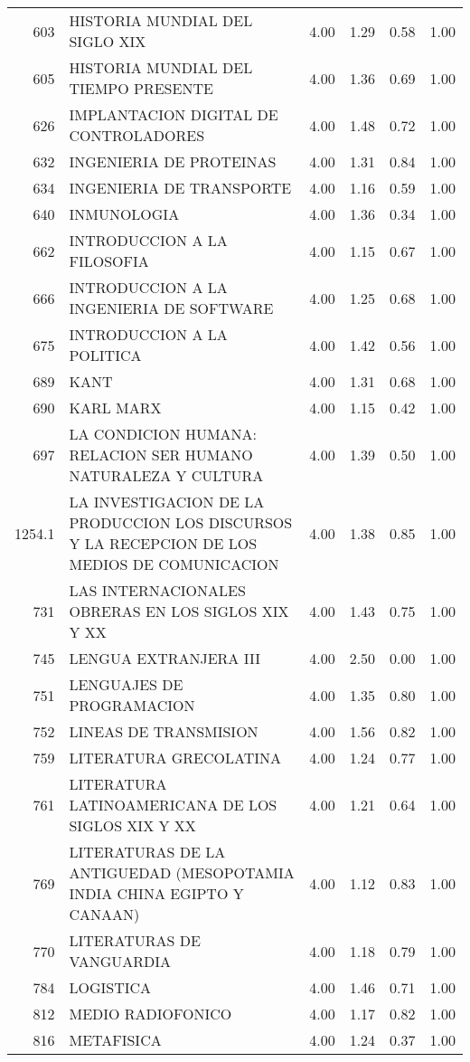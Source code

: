 \documentclass[12pt]{article}
\begin{document}
\begin{table}[ht]
\begin{tabular}{rlrrrr}
  603 & HISTORIA MUNDIAL DEL SIGLO XIX & 4.00 & 1.29 & 0.58 & 1.00 \\ 
  605 & HISTORIA MUNDIAL DEL TIEMPO PRESENTE & 4.00 & 1.36 & 0.69 & 1.00 \\ 
  626 & IMPLANTACION DIGITAL DE CONTROLADORES & 4.00 & 1.48 & 0.72 & 1.00 \\ 
  632 & INGENIERIA DE PROTEINAS & 4.00 & 1.31 & 0.84 & 1.00 \\ 
  634 & INGENIERIA DE TRANSPORTE & 4.00 & 1.16 & 0.59 & 1.00 \\ 
  640 & INMUNOLOGIA & 4.00 & 1.36 & 0.34 & 1.00 \\ 
  662 & INTRODUCCION A LA FILOSOFIA & 4.00 & 1.15 & 0.67 & 1.00 \\ 
  666 & INTRODUCCION A LA INGENIERIA DE SOFTWARE & 4.00 & 1.25 & 0.68 & 1.00 \\ 
  675 & INTRODUCCION A LA POLITICA & 4.00 & 1.42 & 0.56 & 1.00 \\ 
  689 & KANT & 4.00 & 1.31 & 0.68 & 1.00 \\ 
  690 & KARL MARX & 4.00 & 1.15 & 0.42 & 1.00 \\ 
  697 & LA CONDICION HUMANA: RELACION SER HUMANO NATURALEZA Y CULTURA & 4.00 & 1.39 & 0.50 & 1.00 \\ 
  1254.1 & LA INVESTIGACION DE LA PRODUCCION LOS DISCURSOS Y LA RECEPCION DE LOS MEDIOS DE COMUNICACION & 4.00 & 1.38 & 0.85 & 1.00 \\ 
  731 & LAS INTERNACIONALES OBRERAS EN LOS SIGLOS XIX Y XX & 4.00 & 1.43 & 0.75 & 1.00 \\ 
  745 & LENGUA EXTRANJERA III & 4.00 & 2.50 & 0.00 & 1.00 \\ 
  751 & LENGUAJES DE PROGRAMACION & 4.00 & 1.35 & 0.80 & 1.00 \\ 
  752 & LINEAS DE TRANSMISION & 4.00 & 1.56 & 0.82 & 1.00 \\ 
  759 & LITERATURA GRECOLATINA & 4.00 & 1.24 & 0.77 & 1.00 \\ 
  761 & LITERATURA LATINOAMERICANA DE LOS SIGLOS XIX Y XX & 4.00 & 1.21 & 0.64 & 1.00 \\ 
  769 & LITERATURAS DE LA ANTIGUEDAD (MESOPOTAMIA INDIA CHINA EGIPTO Y CANAAN) & 4.00 & 1.12 & 0.83 & 1.00 \\ 
  770 & LITERATURAS DE VANGUARDIA & 4.00 & 1.18 & 0.79 & 1.00 \\ 
  784 & LOGISTICA & 4.00 & 1.46 & 0.71 & 1.00 \\ 
  812 & MEDIO RADIOFONICO & 4.00 & 1.17 & 0.82 & 1.00 \\ 
  816 & METAFISICA & 4.00 & 1.24 & 0.37 & 1.00 \\ 

\end{tabular}
\end{table}
\end{document}
